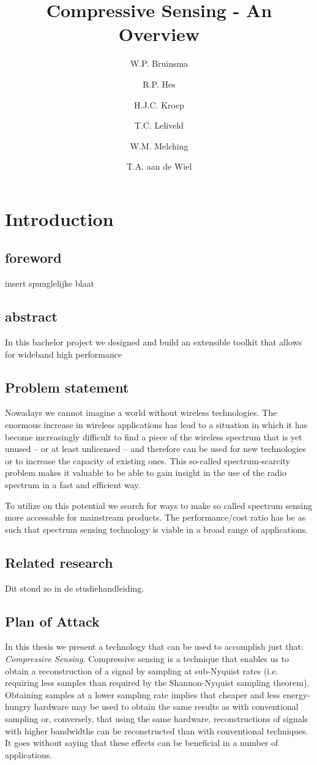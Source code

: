 \documentclass[a4paper, openany, oneside]{memoir}
\title{Compressive Sensing - An Overview}
\author{W.P. Bruinsma \and R.P. Hes \and H.J.C. Kroep \and T.C. Leliveld \and W.M. Melching \and T.A. aan de Wiel}
\begin{document}
\chapter{Introduction}
\section{foreword}
insert spuuglelijke blaat

\section{abstract}
In this bachelor project we designed and build an extensible toolkit that allows for wideband high performance 

\section{Problem statement}
Nowadays we cannot imagine a world without wireless technologies. The enormous increase in wireless applications has lead to a situation in which it has become increasingly difficult to find a piece of the wireless spectrum that is yet unused -- or at least unlicensed -- and therefore can be used for new technologies or to increase the capacity of existing ones. This so-called spectrum-scarcity problem makes it valuable to be able to gain insight in the use of the radio spectrum in a fast and efficient way.

To utilize on this potential we search for ways to make so called spectrum sensing more accessable for mainstream products. The performance/cost ratio has be as such that spectrum sensing technology is viable in a broad range of applications.

\section{Related research}
Dit stond zo in de studiehandleiding. 

\section{Plan of Attack}
In this thesis we present a technology that can be used to accomplish just that: \emph{Compressive Sensing}. Compressive sensing is a technique that enables us to obtain a reconstruction of a signal by sampling at sub-Nyquist rates (i.e. requiring less samples than required by the Shannon-Nyquist sampling theorem). Obtaining samples at a lower sampling rate implies that cheaper and less energy-hungry hardware may be used to obtain the same results as with conventional sampling or, conversely, that using the same hardware, reconstructions of signals with higher bandwidths can be reconstructed than with conventional techniques. It goes without saying that these effects can be beneficial in a number of applications.
\end{document}
